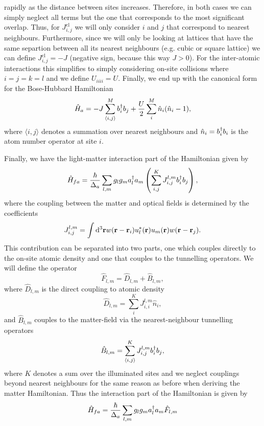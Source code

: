 rapidly as the distance between sites increases. Therefore, in both
cases we can simply neglect all terms but the one that corresponds to
the most significant overlap. Thus, for $J_{i,j}^\mathrm{cl}$ we will
only consider $i$ and $j$ that correspond to nearest neighbours.
Furthermore, since we will only be looking at lattices that have the
same separtion between all its nearest neighbours (e.g. cubic or
square lattice) we can define $J_{i,j}^\mathrm{cl} = - J$ (negative
sign, because this way $J > 0$). For the inter-atomic interactions
this simplifies to simply considering on-site collisions where
$i=j=k=l$ and we define $U_{iiii} = U$. Finally, we end up with the
canonical form for the Bose-Hubbard Hamiltonian
\begin{equation}
  \hat{H}_a = -J \sum_{\langle i,j \rangle}^M b^\dagger_i b_j + 
  \frac{U}{2} \sum_{i}^M \hat{n}_i (\hat{n}_i - 1),
\end{equation}
where $\langle i,j \rangle$ denotes a summation over nearest
neighbours and $\hat{n}_i = b^\dagger_i b_i$ is the atom number operator at
site $i$.

Finally, we have the light-matter interaction part of the Hamiltonian
given by
\begin{equation}
  \hat{H}_{fa} = \frac{\hbar}{\Delta_a} \sum_{l,m} g_l g_m a^\dagger_l a_m
  \left( \sum_{i,j}^K J^{l,m}_{i,j} b^\dagger_i b_j \right),
\end{equation}
where the coupling between the matter and optical fields is determined
by the coefficients
\begin{equation}
  J^{l,m}_{i,j} = \int \mathrm{d}^3 \mathbf{r} w(\mathbf{r} - \mathbf{r}_i)
  u_l^*(\mathbf{r}) u_m(\mathbf{r}) w(\mathbf{r} - \mathbf{r}_j).
\end{equation}
This contribution can be separated into two parts, one which couples
directly to the on-site atomic density and one that couples to the
tunnelling operators. We will define the operator
\begin{equation}
  \label{eq:F}
  \hat{F}_{l,m} = \hat{D}_{l,m} + \hat{B}_{l,m},
\end{equation}
where $\hat{D}_{l,m}$ is the direct coupling to atomic density
\begin{equation}
  \label{eq:D}
  \hat{D}_{l,m} = \sum_{i}^K J^{l,m}_{i,i} \hat{n}_i,
\end{equation}
and $\hat{B}_{l,m}$ couples to the matter-field via the
nearest-neighbour tunnelling operators
\begin{equation}
  \label{eq:B}
  \hat{B}_{l,m} = \sum_{\langle i, j \rangle}^K J^{l,m}_{i,j} b^\dagger_i b_j,
\end{equation}
where $K$ denotes a sum over the illuminated sites and we neglect
couplings beyond nearest neighbours for the same reason as before when
deriving the matter Hamiltonian. Thus the interaction part of the
Hamiltonian is given by
\begin{equation}
  \hat{H}_{fa} = \frac{\hbar}{\Delta_a} \sum_{l,m} g_l g_m a^\dagger_l a_m \hat{F}_{l,m}
\end{equation}

